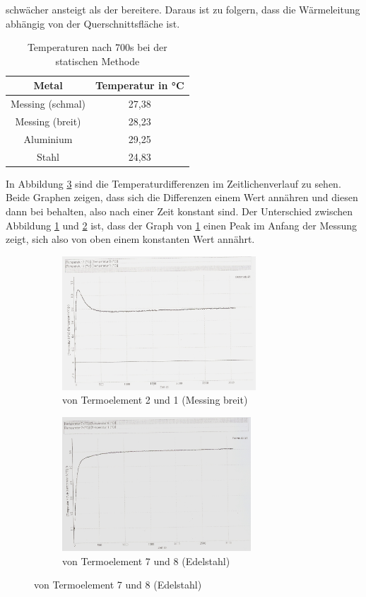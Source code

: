 schwächer ansteigt als der bereitere. Daraus ist zu folgern, dass die Wärmeleitung
abhängig von der Querschnittsfläche ist.
\begin{table}
  \centering
  \caption{Temperaturen nach 700s bei der statischen Methode}
  \begin{tabular}{c c}
    \toprule
    Metal & Temperatur in \si{\celsius} \\
    \midrule
    Messing (schmal) & 27,38 \\
    Messing (breit) & 28,23 \\
    Aluminium & 29,25 \\
    Stahl & 24,83 \\
    \bottomrule
  \end{tabular}
  \label{tab:700s}
\end{table}
\FloatBarrier
In Abbildung \ref{fig:dt} sind die Temperaturdifferenzen im Zeitlichenverlauf zu
sehen. Beide Graphen zeigen, dass sich die Differenzen einem Wert annähren und
diesen dann bei behalten, also nach einer Zeit konstant sind.
Der Unterschied zwischen Abbildung \ref{fig:dt2t1} und \ref{fig:dt7t8} ist, dass
der Graph von \ref{fig:dt2t1} einen Peak im Anfang der Messung zeigt, sich also von
oben einem konstanten Wert annährt.
\begin{figure}
  \centering
  \caption{Zeitlicherverlauf der Temperaturdifferenzen}
  \begin{subfigure}{0.48\textwidth}
    \centering
    \includegraphics[height = 5cm, width = \textwidth]{logos/T2-T1.jpg}
    \caption{von Termoelement 2 und 1 (Messing breit)}
    \label{fig:dt2t1}
  \end{subfigure}
  \begin{subfigure}{0.48\textwidth}
    \centering
    \includegraphics[height=5cm, width = \textwidth]{logos/T7-T8.jpg}
    \caption{von Termoelement 7 und 8 (Edelstahl)}
    \label{fig:dt7t8}
  \end{subfigure}
  \label{fig:dt}
\end{figure}
